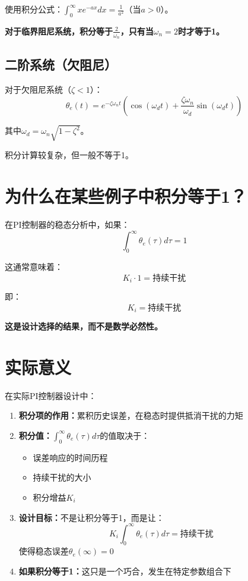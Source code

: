 \documentclass[12pt,a4paper]{article}
\begin{document}
使用积分公式：$\int_0^{\infty} x e^{-ax} dx = \frac{1}{a^2}$（当$a > 0$）。

\textbf{对于临界阻尼系统，积分等于$\frac{2}{\omega_n}$，只有当$\omega_n = 2$时才等于1。}

\subsection{二阶系统（欠阻尼）}

对于欠阻尼系统（$\zeta < 1$）：
\begin{equation}
\theta_e(t) = e^{-\zeta\omega_n t}\left(\cos(\omega_d t) + \frac{\zeta\omega_n}{\omega_d}\sin(\omega_d t)\right)
\end{equation}

其中$\omega_d = \omega_n\sqrt{1-\zeta^2}$。

积分计算较复杂，但一般不等于1。

\section{为什么在某些例子中积分等于1？}

在PI控制器的稳态分析中，如果：
\begin{equation}
\int_0^{\infty} \theta_e(\tau) d\tau = 1
\end{equation}

这通常意味着：
\begin{equation}
K_i \cdot 1 = \text{持续干扰}
\end{equation}

即：
\begin{equation}
K_i = \text{持续干扰}
\end{equation}

\textbf{这是设计选择的结果，而不是数学必然性。}

\section{实际意义}

在实际PI控制器设计中：

\begin{enumerate}
\item \textbf{积分项的作用：}累积历史误差，在稳态时提供抵消干扰的力矩

\item \textbf{积分值：}$\int_0^{\infty} \theta_e(\tau) d\tau$的值取决于：
   \begin{itemize}
   \item 误差响应的时间历程
   \item 持续干扰的大小
   \item 积分增益$K_i$
   \end{itemize}

\item \textbf{设计目标：}不是让积分等于1，而是让：
   \begin{equation}
   K_i \int_0^{\infty} \theta_e(\tau) d\tau = \text{持续干扰}
   \end{equation}
   使得稳态误差$\theta_e(\infty) = 0$

\item \textbf{如果积分等于1：}这只是一个巧合，发生在特定参数组合下
\end{enumerate}
\end{document}
